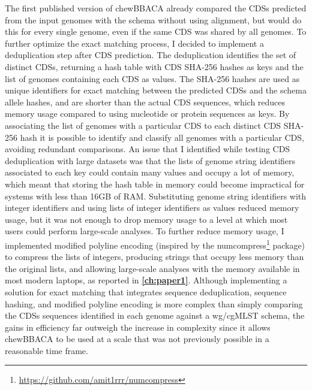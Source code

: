 The first published version of chewBBACA \cite{silva_chewbbaca_2018} already compared the \acp{CDS} predicted from the input genomes with the schema without using alignment, but would do this for every single genome, even if the same \ac{CDS} was shared by all genomes. To further optimize the exact matching process, I decided to implement a deduplication step after \ac{CDS} prediction. The deduplication identifies the set of distinct \acp{CDS}, returning a hash table with \ac{CDS} SHA-256 hashes as keys and the list of genomes containing each \ac{CDS} as values. The SHA-256 hashes are used as unique identifiers for exact matching between the predicted \acp{CDS} and the schema allele hashes, and are shorter than the actual \ac{CDS} sequences, which reduces memory usage compared to using nucleotide or protein sequences as keys. By associating the list of genomes with a particular \ac{CDS} to each distinct \ac{CDS} SHA-256 hash it is possible to identify and classify all genomes with a particular \ac{CDS}, avoiding redundant comparisons. An issue that I identified while testing \ac{CDS} deduplication with large datasets was that the lists of genome string identifiers associated to each key could contain many values and occupy a lot of memory, which meant that storing the hash table in memory could become impractical for systems with less than 16GB of \ac{RAM}. Substituting genome string identifiers with integer identifiers and using lists of integer identifiers as values reduced memory usage, but it was not enough to drop memory usage to a level at which most users could perform large-scale analyses. To further reduce memory usage, I implemented modified polyline encoding (inspired by the numcompress\footnote{\url{https://github.com/amit1rrr/numcompress}} package) to compress the lists of integers, producing strings that occupy less memory than the original lists, and allowing large-scale analyses with the memory available in most modern laptops, as reported in \textbf{\autoref{ch:paper1}}. Although implementing a solution for exact matching that integrates sequence deduplication, sequence hashing, and modified polyline encoding is more complex than simply comparing the \acp{CDS} sequences identified in each genome against a \ac{wg/cgMLST} schema, the gains in efficiency far outweigh the increase in complexity since it allows chewBBACA to be used at a scale that was not previously possible in a reasonable time frame.

